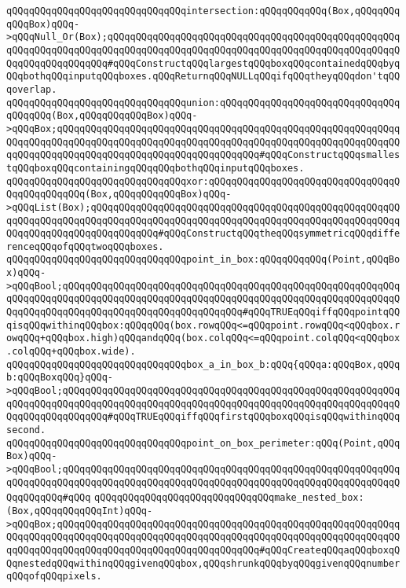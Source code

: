 \verb|qQQqqQQqqQQqqQQqqQQqqQQqqQQqqQQqintersection:qQQqqQQqqQQq(Box,qQQqqQQqqQQqBox)qQQq->qQQqNull_Or(Box);qQQqqQQqqQQqqQQqqQQqqQQqqQQqqQQqqQQqqQQqqQQqqQQqqQQqqQQqqQQqqQQqqQQqqQQqqQQqqQQqqQQqqQQqqQQqqQQqqQQqqQQqqQQqqQQqqQQqqQQqqQQqqQQqqQQqqQQqqQQq#qQQqConstructqQQqlargestqQQqboxqQQqcontainedqQQqbyqQQqbothqQQqinputqQQqboxes.qQQqReturnqQQqNULLqQQqifqQQqtheyqQQqdon'tqQQqoverlap.|\newline
\verb|qQQqqQQqqQQqqQQqqQQqqQQqqQQqqQQqunion:qQQqqQQqqQQqqQQqqQQqqQQqqQQqqQQqqQQqqQQq(Box,qQQqqQQqqQQqBox)qQQq->qQQqBox;qQQqqQQqqQQqqQQqqQQqqQQqqQQqqQQqqQQqqQQqqQQqqQQqqQQqqQQqqQQqqQQqqQQqqQQqqQQqqQQqqQQqqQQqqQQqqQQqqQQqqQQqqQQqqQQqqQQqqQQqqQQqqQQqqQQqqQQqqQQqqQQqqQQqqQQqqQQqqQQqqQQqqQQqqQQqqQQq#qQQqConstructqQQqsmallestqQQqboxqQQqcontainingqQQqqQQqbothqQQqinputqQQqboxes.|\newline
\verb|qQQqqQQqqQQqqQQqqQQqqQQqqQQqqQQqxor:qQQqqQQqqQQqqQQqqQQqqQQqqQQqqQQqqQQqqQQqqQQqqQQq(Box,qQQqqQQqqQQqBox)qQQq->qQQqList(Box);qQQqqQQqqQQqqQQqqQQqqQQqqQQqqQQqqQQqqQQqqQQqqQQqqQQqqQQqqQQqqQQqqQQqqQQqqQQqqQQqqQQqqQQqqQQqqQQqqQQqqQQqqQQqqQQqqQQqqQQqqQQqqQQqqQQqqQQqqQQqqQQqqQQqqQQq#qQQqConstructqQQqtheqQQqsymmetricqQQqdifferenceqQQqofqQQqtwoqQQqboxes.|\newline
\verb|qQQqqQQqqQQqqQQqqQQqqQQqqQQqqQQqpoint_in_box:qQQqqQQqqQQq(Point,qQQqBox)qQQq->qQQqBool;qQQqqQQqqQQqqQQqqQQqqQQqqQQqqQQqqQQqqQQqqQQqqQQqqQQqqQQqqQQqqQQqqQQqqQQqqQQqqQQqqQQqqQQqqQQqqQQqqQQqqQQqqQQqqQQqqQQqqQQqqQQqqQQqqQQqqQQqqQQqqQQqqQQqqQQqqQQqqQQqqQQqqQQqqQQq#qQQqTRUEqQQqiffqQQqpointqQQqisqQQqwithinqQQqbox:qQQqqQQq(box.rowqQQq<=qQQqpoint.rowqQQq<qQQqbox.rowqQQq+qQQqbox.high)qQQqandqQQq(box.colqQQq<=qQQqpoint.colqQQq<qQQqbox.colqQQq+qQQqbox.wide).|\newline
\verb|qQQqqQQqqQQqqQQqqQQqqQQqqQQqqQQqbox_a_in_box_b:qQQq{qQQqa:qQQqBox,qQQqb:qQQqBoxqQQq}qQQq->qQQqBool;qQQqqQQqqQQqqQQqqQQqqQQqqQQqqQQqqQQqqQQqqQQqqQQqqQQqqQQqqQQqqQQqqQQqqQQqqQQqqQQqqQQqqQQqqQQqqQQqqQQqqQQqqQQqqQQqqQQqqQQqqQQqqQQqqQQqqQQqqQQqqQQqqQQq#qQQqTRUEqQQqiffqQQqfirstqQQqboxqQQqisqQQqwithinqQQqsecond.|\newline
\newline
\verb|qQQqqQQqqQQqqQQqqQQqqQQqqQQqqQQqpoint_on_box_perimeter:qQQq(Point,qQQqBox)qQQq->qQQqBool;qQQqqQQqqQQqqQQqqQQqqQQqqQQqqQQqqQQqqQQqqQQqqQQqqQQqqQQqqQQqqQQqqQQqqQQqqQQqqQQqqQQqqQQqqQQqqQQqqQQqqQQqqQQqqQQqqQQqqQQqqQQqqQQqqQQqqQQqqQQq#qQQq|\newline
\newline
\verb|qQQqqQQqqQQqqQQqqQQqqQQqqQQqqQQqmake_nested_box:(Box,qQQqqQQqqQQqInt)qQQq->qQQqBox;qQQqqQQqqQQqqQQqqQQqqQQqqQQqqQQqqQQqqQQqqQQqqQQqqQQqqQQqqQQqqQQqqQQqqQQqqQQqqQQqqQQqqQQqqQQqqQQqqQQqqQQqqQQqqQQqqQQqqQQqqQQqqQQqqQQqqQQqqQQqqQQqqQQqqQQqqQQqqQQqqQQqqQQqqQQqqQQq#qQQqCreateqQQqaqQQqboxqQQqnestedqQQqwithinqQQqgivenqQQqbox,qQQqshrunkqQQqbyqQQqgivenqQQqnumberqQQqofqQQqpixels.|\newline
